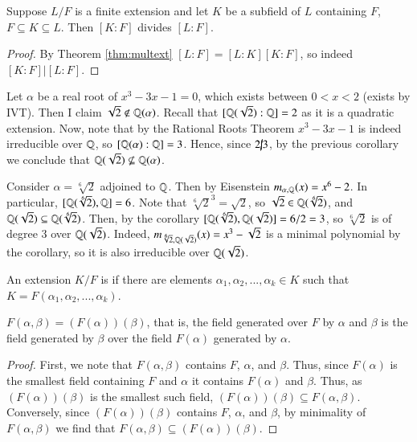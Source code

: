 \documentclass[12pt, a4paper, oneside, openright, titlepage]{book}
\begin{document}
\begin{cor}\label{cor:extdiv}
    Suppose $L/F$ is a finite extension and let $K$ be a subfield of $L$ containing $F$, $F \subseteq K \subseteq L$. Then $[K:F]$ divides $[L:F]$.
\end{cor}
\begin{proof}
    By Theorem \ref{thm:multext} $[L:F] = [L:K][K:F]$, so indeed $[K:F] \vert [L:F]$.
\end{proof}


\begin{eg}
    Let $\alpha$ be a real root of $x^3-3x-1 = 0$, which exists between $0 < x < 2$ (exists by IVT). Then I claim $\sqrt{2} \notin \mathbb Q(\alpha)$. Recall that $[\mathbb Q(\sqrt{2}):\mathbb Q] = 2$ as it is a quadratic extension. Now, note that by the Rational Roots Theorem $x^3-3x-1$ is indeed irreducible over $\mathbb Q$, so $[\mathbb Q(\alpha):\mathbb Q] = 3$. Hence, since $2\cancel{\vert}3$, by the previous corollary we conclude that $\mathbb Q(\sqrt{2})\nsubseteq \mathbb Q(\alpha)$.
\end{eg}

\begin{eg}
    Consider $\alpha = \sqrt[6]{2}$ adjoined to $\mathbb Q$. Then by Eisenstein $m_{\alpha,\mathbb Q}(x) = x^6 - 2$. In particular, $[\mathbb Q(\sqrt[6]{2}),\mathbb Q] = 6$. Note that $\sqrt[6]{2}^3 = \sqrt{2}$, so $\sqrt{2} \in \mathbb Q(\sqrt[6]{2})$, and $\mathbb Q(\sqrt{2}) \subseteq \mathbb Q(\sqrt[6]{2})$. Then, by the corollary $[\mathbb Q(\sqrt[6]{2}),\mathbb Q(\sqrt{2})] = 6/2 = 3$, so $\sqrt[6]{2}$ is of degree $3$ over $\mathbb Q(\sqrt{2})$. Indeed, $m_{\sqrt[6]{2},\mathbb Q(\sqrt{2})}(x) = x^3 - \sqrt{2}$ is a minimal polynomial by the corollary, so it is also irreducible over $\mathbb Q(\sqrt{2})$.
\end{eg}

\begin{defn}
    An extension $K/F$ is  if there are elements $\alpha_1,\alpha_2,...,\alpha_k \in K$ such that $K = F(\alpha_1,\alpha_2,...,\alpha_k)$.
\end{defn}


\begin{lem}
    $F(\alpha,\beta) = (F(\alpha))(\beta)$, that is, the field generated over $F$ by $\alpha$ and $\beta$ is the field generated by $\beta$ over the field $F(\alpha)$ generated by $\alpha$.
\end{lem}
\begin{proof}
    First, we note that $F(\alpha,\beta)$ contains $F$, $\alpha$, and $\beta$. Thus, since $F(\alpha)$ is the smallest field containing $F$ and $\alpha$ it contains $F(\alpha)$ and $\beta$. Thus, as $(F(\alpha))(\beta)$ is the smallest such field, $(F(\alpha))(\beta) \subseteq F(\alpha,\beta)$. Conversely, since $(F(\alpha))(\beta)$ contains $F$, $\alpha$, and $\beta$, by minimality of $F(\alpha,\beta)$ we find that $F(\alpha,\beta) \subseteq (F(\alpha))(\beta)$.
\end{proof}
\end{document}
